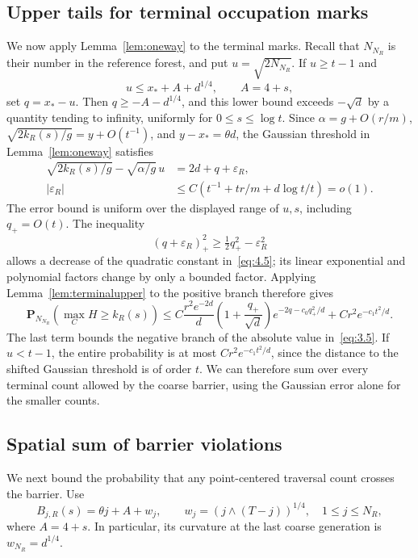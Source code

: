 \documentclass[11pt,letterpaper,reqno]{amsart}
\numberwithin{equation}{section}
\theoremstyle{remark}
\begin{document}
\subsection{Upper tails for terminal occupation marks}\label{sec:terminalmarksupper}
We now apply Lemma~\ref{lem:oneway} to the terminal marks. Recall that $N_{N_R}$ is their number in the reference forest, and put $u=\sqrt{2N_{N_R}}$. If $u\ge t-1$ and
\[
u\le x_*+A+d^{1/4},\qquad A=4+s,
\]
set $q=x_*-u$. Then $q\ge-A-d^{1/4}$, and this lower bound exceeds $-\sqrt d$ by a quantity tending to infinity, uniformly for $0\le s\le\log t$. Since $\alpha=g+O(r/m)$, $\sqrt{2k_R(s)/g}=y+O(t^{-1})$, and $y-x_*=\theta d$, the Gaussian threshold in Lemma~\ref{lem:oneway} satisfies
\begin{equation}\label{eq:4.10}
\begin{split}
\sqrt{2k_R(s)/g}-\sqrt{\alpha/g}\,u
&=2d+q+\varepsilon_R,\\
|\varepsilon_R|
&\le C\left(t^{-1}+tr/m+d\log t/t\right)=o(1).
\end{split}
\end{equation}
The error bound is uniform over the displayed range of $u,s$, including $q_+=O(t)$. The inequality
\[
(q+\varepsilon_R)_+^2\ge\tfrac12q_+^2-\varepsilon_R^2
\]
allows a decrease of the quadratic constant in~\eqref{eq:4.5}; its linear exponential and polynomial factors change by only a bounded factor. Applying Lemma~\ref{lem:terminalupper} to the positive branch therefore gives
\begin{equation}\label{eq:4.11}
\mathbf P_{N_{N_R}}(\max_CH\ge k_R(s))
\le C\frac{r^2e^{-2d}}d
\left(1+\frac{q_+}{\sqrt d}\right)e^{-2q-c_0q_+^2/d}
+Cr^2e^{-c_1t^2/d}.
\end{equation}
The last term bounds the negative branch of the absolute value in~\eqref{eq:3.5}. If $u<t-1$, the entire probability is at most $Cr^2e^{-c_1t^2/d}$, since the distance to the shifted Gaussian threshold is of order $t$. We can therefore sum over every terminal count allowed by the coarse barrier, using the Gaussian error alone for the smaller counts.

\subsection{Spatial sum of barrier violations}\label{sec:barrierviolations}
We next bound the probability that any point-centered traversal count crosses the barrier. Use
\begin{equation}\label{eq:4.12}
B_{j,R}(s)=\theta j+A+w_j,\qquad
w_j=(j\wedge(T-j))^{1/4},\quad 1\le j\le N_R,
\end{equation}
where $A=4+s$. In particular, its curvature at the last coarse generation is $w_{N_R}=d^{1/4}$.
\end{document}
